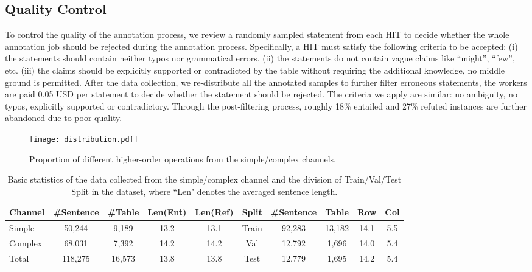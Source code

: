 \documentclass{article} \usepackage{iclr2020_conference,times}
\begin{document}
\subsection{Quality Control}
To control the quality of the annotation process, we review a randomly sampled statement from each HIT to decide whether the whole annotation job should be rejected during the annotation process. Specifically, a HIT must satisfy the following criteria to be accepted: (i) the statements should contain neither typos nor grammatical errors. (ii) the statements do not contain vague claims like “might”, “few”, etc. (iii) the claims should be explicitly supported or contradicted by the table without requiring the additional knowledge, no middle ground is permitted. After the data collection, we re-distribute all the annotated samples to further filter erroneous statements, the workers are paid 0.05 USD per statement to decide whether the statement should be rejected. The criteria we apply are similar: no ambiguity, no typos, explicitly supported or contradictory. Through the post-filtering process, roughly 18\% entailed and 27\% refuted instances are further abandoned due to poor quality.
\begin{figure}[thb]
    \centering
    \texttt{[image: distribution.pdf]}
    \caption{Proportion of different higher-order operations from the simple/complex channels.}
    \vspace{-2ex}
    \label{fig:channel}
\end{figure}

\begin{table}[thb]
    \centering
    \small
    \begin{tabular}{lcccc|ccccc} 
    \toprule
Channel & \#Sentence & \#Table & Len(Ent) & Len(Ref) & Split & \#Sentence &  Table & Row & Col\\
    \midrule
     Simple                             & 50,244                                       & 9,189                                          & 13.2 & 13.1  & Train & 92,283 & 13,182 & 14.1 & 5.5       \\
    Complex                             & 68,031                                       & 7,392                                          & 14.2 & 14.2  & Val & 12,792 & 1,696 & 14.0 & 5.4        \\
    Total                               &      118,275                                 & 16,573                                         & 13.8 & 13.8 & Test & 12,779 & 1,695 & 14.2 & 5.4        \\
    \bottomrule
    \end{tabular}
    \caption{Basic statistics of the data collected from the simple/complex channel and the division of Train/Val/Test Split in the dataset, where ``Len" denotes the averaged sentence length.}
    \label{tab:train_val_test}
\vspace{-4ex}
\end{table}
\end{document}
